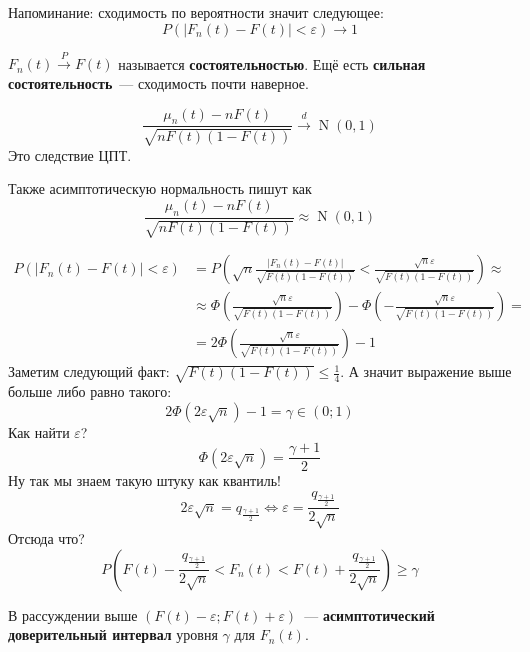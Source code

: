 \documentclass{article}
\begin{document}
    \begin{remark}
        Напоминание: сходимость по вероятности значит следующее:
        \[
        P(|F_n(t)-F(t)|<\varepsilon)\rightarrow 1
        \]
    \end{remark}
    \begin{remark}
        $F_n(t)\overset P\longrightarrow F(t)$ называется \textbf{состоятельностью}. Ещё есть \textbf{сильная состоятельность}~--- сходимость почти наверное.
    \end{remark}
    \begin{property}
        \[
        \frac{\mu_n(t)-nF(t)}{\sqrt{nF(t)(1-F(t))}}\overset d\longrightarrow\operatorname{N}(0,1)
        \]
        Это следствие ЦПТ.
    \end{property}
    \begin{remark}
        Также асимптотическую нормальность пишут как
        \[
        \frac{\mu_n(t)-nF(t)}{\sqrt{nF(t)(1-F(t))}}\approx\operatorname{N}(0,1)
        \]
    \end{remark}
    \begin{discourse}
        \[
        \begin{split}
            P(|F_n(t)-F(t)|<\varepsilon)&=P\left(\sqrt n\frac{|F_n(t)-F(t)|}{\sqrt{F(t)(1-F(t))}}<\frac{\sqrt n\varepsilon}{\sqrt{F(t)(1-F(t))}}\right)\approx\\
            &\approx\Phi\left(\frac{\sqrt n\varepsilon}{\sqrt{F(t)(1-F(t))}}\right)-\Phi\left(-\frac{\sqrt n\varepsilon}{\sqrt{F(t)(1-F(t))}}\right)=\\
            &=2\Phi\left(\frac{\sqrt n\varepsilon}{\sqrt{F(t)(1-F(t))}}\right)-1
        \end{split}
        \]
        Заметим следующий факт: $\sqrt{F(t)(1-F(t))}\leqslant\frac14$. А значит выражение выше больше либо равно такого:
        \[
        2\Phi(2\varepsilon\sqrt n)-1=\gamma\in(0;1)
        \]
        Как найти $\varepsilon$?
        \[
        \Phi(2\varepsilon\sqrt n)=\frac{\gamma+1}2
        \]
        Ну так мы знаем такую штуку как квантиль!
        \[
        2\varepsilon\sqrt n=q_{\frac{\gamma+1}2}\Leftrightarrow\varepsilon=\frac{q_{\frac{\gamma+1}2}}{2\sqrt n}
        \]
        Отсюда что?
        \[
        P\left(F(t)-\frac{q_{\frac{\gamma+1}2}}{2\sqrt n}<F_n(t)<F(t)+\frac{q_{\frac{\gamma+1}2}}{2\sqrt n}\right)\geqslant\gamma
        \]
    \end{discourse}
    \begin{definition}
        В рассуждении выше $(F(t)-\varepsilon;F(t)+\varepsilon)$~--- \textbf{асимптотический доверительный интервал} уровня $\gamma$ для $F_n(t)$.
    \end{definition}
\end{document}
